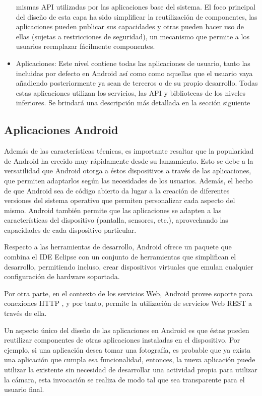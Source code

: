 \begin{itemize}
mismas \ac{API} utilizadas por las aplicaciones base del sistema.
El foco principal del diseño de esta capa ha sido simplificar la reutilización
de componentes, las aplicaciones pueden publicar sus capacidades y
otras pueden hacer uso de ellas (sujetas a restricciones de seguridad),
un mecanismo que permite a los usuarios reemplazar fácilmente componentes. 
\item Aplicaciones: Este nivel contiene todas las aplicaciones de usuario,
tanto las incluidas por defecto en Android así como como aquellas
que el usuario vaya añadiendo posteriormente ya sean de terceros o
de su propio desarrollo. Todas estas aplicaciones utilizan los servicios,
las \ac{API} y bibliotecas de los niveles inferiores. Se brindará
una descripción más detallada en la sección siguiente
\end{itemize}

\subsection{Aplicaciones Android \label{sec:Aplicaciones-Android}}

Además de las características técnicas, es importante resaltar que
la popularidad de Android ha crecido muy rápidamente desde su lanzamiento.
Esto se debe a la versatilidad que Android otorga a éstos dispositivos
a través de las aplicaciones, que permiten adaptarlos según las necesidades
de los usuarios. Además, el hecho de que Android sea de código abierto
da lugar a la creación de diferentes versiones del sistema operativo
que permiten personalizar cada aspecto del mismo. Android también
permite que las aplicaciones se adapten a las características del
dispositivo (pantalla, sensores, etc.), aprovechando las capacidades
de cada dispositivo particular. 

Respecto a las herramientas de desarrollo, Android ofrece un paquete
que combina el \ac{IDE} Eclipse con un conjunto de herramientas que
simplifican el desarrollo, permitiendo incluso, crear dispositivos
virtuales que emulan cualquier configuración de hardware soportada. 

Por otra parte, en el contexto de los servicios Web, Android provee
soporte para conexiones \ac{HTTP} , y por tanto, permite la utilización
de servicios Web \ac{REST} a través de ella. 

Un aspecto único del diseño de las aplicaciones en Android es que
éstas pueden reutilizar componentes de otras aplicaciones instaladas
en el dispositivo. Por ejemplo, si una aplicación desea tomar una
fotografía, es probable que ya exista una aplicación que cumpla esa
funcionalidad, entonces, la nueva aplicación puede utilizar la existente
sin necesidad de desarrollar una actividad propia para utilizar la
cámara, esta invocación se realiza de modo tal que sea transparente
para el usuario final.

